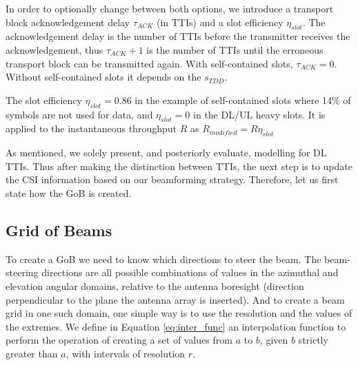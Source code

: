 In order to optionally change between both options, we introduce a transport block acknowledgement delay $\tau_{ACK}$ (in TTIs)  and a slot efficiency $\eta_{slot}$. The acknowledgement delay is the number of TTIs before the transmitter receives the acknowledgement, thus $\tau_{ACK} + 1$ is the number of TTIs until the erroneous transport block can be transmitted again. With self-contained slots, $\tau_{ACK} = 0$. Without self-contained slots it depends on the $s_{TDD}$.

The slot efficiency $\eta_{slot} = 0.86$ in the example of self-contained slots where 14\% of symbols are not used for data, and $\eta_{slot} = 0$ in the DL/UL heavy slots. It is applied to the instantaneous throughput $R$ as $R_{modified} = R \eta_{slot}$

\begin{comment}
Equations \eqref{eq:tdd_split} and \eqref{eq:slot_per}.

\begin{align}
    s_\text{TDD} &= N^\text{DL}_\text{slots} \ / \ N^\text{UL}_\text{slots} \label{eq:tdd_split} \\
    P_\text{slot} &= N^\text{DL}_\text{slots} + N^\text{UL}_\text{slots} \label{eq:slot_per}
\end{align}
\end{comment}

As mentioned, we solely present, and posteriorly evaluate, modelling for DL TTIs. Thus after making the distinction between TTIs, the next step is to update the CSI information based on our beamforming strategy. Therefore, let us first state how the \ac{GoB} is created.

\subsection*{Grid of Beams}
\label{sec:GoB}

To create a GoB we need to know which directions to steer the beam. The beam-steering directions are all possible combinations of values in the azimuthal and elevation angular domains, relative to the antenna boresight (direction perpendicular to the plane the antenna array is inserted). And to create a beam grid in one such domain, one simple way is to use the resolution and the values of the extremes. We define in Equation \eqref{eq:inter_func} an interpolation function to perform the operation of creating a set of values from $a$ to $b$, given $b$ strictly greater than $a$, with intervals of resolution $r$.


